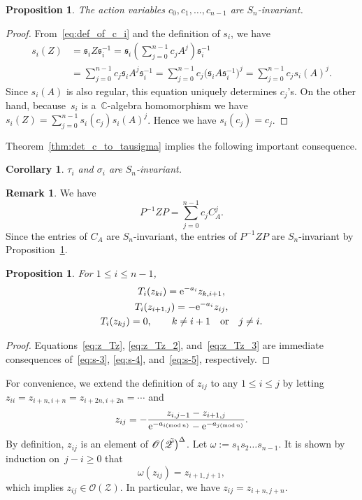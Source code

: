 \documentclass[10pt,a4paper]{amsart}
\numberwithin{equation}{section}
\newcommand{\C}{\mathbb{C}}
\newcommand{\reg}{\Delta}
\newtheorem{Corollary}[Theorem]{Corollary}
\newtheorem{Proposition}[Theorem]{Proposition}
\theoremstyle{definition}
\newtheorem{Remark}[Theorem]{Remark}
\begin{document}
\begin{Proposition}\label{prop:S_n_invariant_functions}
The action variables $c_0,c_1,\dots,c_{n-1}$ are $S_n$-invariant.
\end{Proposition}
\begin{proof}
From~\eqref{eq:def_of_c_i} and the definition of $s_i$, we have
\begin{align*}
s_i(Z)&=\mathfrak{s}_iZ\mathfrak{s}_i^{-1}
=\mathfrak{s}_i\left(\sum_{j=0}^{n-1}c_jA^j\right)\mathfrak{s}_i^{-1}\\
&=\sum_{j=0}^{n-1}c_j\mathfrak{s}_iA^j\mathfrak{s}_i^{-1}=\sum_{j=0}^{n-1}c_j\bigl(\mathfrak{s}_iA\mathfrak{s}_i^{-1}\bigr)^j=\sum_{j=0}^{n-1}c_js_i(A)^j.
\end{align*}
Since $s_i(A)$ is also regular, this equation uniquely determines $c_j$'s.
On the other hand, because~$s_i$ is a~$\C$-algebra homomorphism we have
$s_i(Z)=\sum_{j=0}^{n-1}s_i(c_j)s_i(A)^j$.
Hence we have $s_i(c_j)=c_j$.
\end{proof}
Theorem~\ref{thm:det_c_to_tausigma} implies the following important consequence.
\begin{Corollary}\label{cor:tausigma invariant}
 $\tau_i$ and $\sigma_i$ are $S_n$-invariant.
\end{Corollary}
\begin{Remark}\label{rem:PinvZP}
We have
\[
P^{-1}ZP=\sum_{j=0}^{n-1}c_j C_A^j.
\]
Since the entries of $C_A$ are $S_n$-invariant,
the entries of $P^{-1}ZP$ are $S_n$-invariant by Proposition~\ref{prop:S_n_invariant_functions}.
\end{Remark}

\begin{Proposition}\label{prop:T_action_on_z}
For $1\le i\le n-1$,
\begin{gather}
T_i(z_{ki})={\rm e}^{-a_i}z_{k,i+1},\label{eq:z_Tz}\\
T_i(z_{i+1,j})=-{\rm e}^{-a_i}z_{ij},\label{eq:z_Tz_2}\\
T_i(z_{kj})=0,\qquad
k\ne i+1 \quad \text{or}\quad j\ne i.\label{eq:z_Tz_3}
\end{gather}
\end{Proposition}

\begin{proof}
Equations~\eqref{eq:z_Tz}, \eqref{eq:z_Tz_2}, and~\eqref{eq:z_Tz_3} are immediate consequences of~\eqref{eq:s-3}, \eqref{eq:s-4}, and~\eqref{eq:s-5}, respectively.
\end{proof}

For convenience, we extend the definition of $z_{ij}$ to any $1\le i\le j$ by letting $z_{ii}=z_{i+n,i+n}=z_{i+2n,i+2n}=\cdots$ and
\[%
z_{ij}=-
\frac{z_{i,j-1}-z_{i+1,j}}{{\rm e}^{-a_{i(\mathrm{mod}\, n)}}-{\rm e}^{-a_{j(\mathrm{mod}\, n)}}}.
\]
By definition, $z_{ij}$ is an element of $\mathscr{O}\bigl(\Tilde{\mathscr{Z}}\bigr)^{\reg}$.
Let $\omega:=s_1s_2\dots s_{n-1} $.
It is shown by induction on~${j-i\geq 0}$ that
\begin{equation}\label{eq:pi_zij}
\omega(z_{ij})=z_{i+1,j+1},
\end{equation}
which implies $z_{ij}\in \mathscr{O}(\mathscr{Z})$.
In particular, we have $z_{ij}=z_{i+n,j+n}$.
\end{document}
